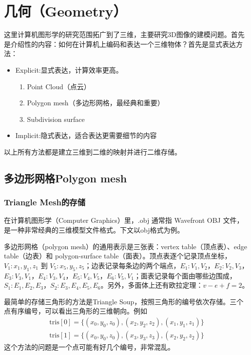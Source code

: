 \section{几何（Geometry）}

这里计算机图形学的研究范围拓广到了三维，主要研究3D图像的建模问题。首先是介绍性的内容：如何在计算机上编码和表达一个三维物体？首先是显式表达方法：

\begin{itemize}
    \item Explicit:显式表达，计算效率更高。
    \begin{enumerate}
        \item Point Cloud（点云）
        \item Polygon mesh（多边形网格，最经典和重要）
        \item Subdivision surface
    \end{enumerate}
    \item Implicit:隐式表达，适合表达更需要细节的内容
\end{itemize}

以上所有方法都是建立三维到二维的映射并进行二维存储。

\subsection{多边形网格Polygon mesh}

\subsubsection{Triangle Mesh的存储}

在计算机图形学（Computer Graphics）里，.obj 通常指 Wavefront OBJ 文件，是一种非常经典的三维模型文件格式。下文以obj格式为例。

多边形网格（polygon mesh）的通用表示是三张表：vertex table（顶点表）、edge table（边表）和 polygon-surface table（面表）。顶点表逐个记录顶点坐标，$V_1: x_1, y_1, z_1$ 到 $V_5: x_5, y_5, z_5$；边表记录每条边的两个端点，$E_1: V_1, V_2$，$E_2: V_2, V_3$，$E_3: V_3, V_1$，$E_4: V_3, V_4$，$E_5: V_4, V_5$，$E_6: V_5, V_1$；面表记录每个面由哪些边围成，$S_1: E_1, E_2, E_3$，$S_2: E_3, E_4, E_5, E_6$。另外，多面体上还有欧拉定理：$v - e + f = 2$。

最简单的存储三角形的方法是Triangle Soup，按照三角形的编号依次存储。三个点有序编号，可以看出三角形的三维朝向。例如
\[
\begin{gathered}
\text{tris}[0] = \{(x_0, y_0, z_0), (x_2, y_2, z_2), (x_1, y_1, z_1)\} \\
\text{tris}[1] = \{(x_0, y_0, z_0), (x_3, y_3, z_3), (x_2, y_2, z_2)\}
\end{gathered}
\]
这个方法的问题是一个点可能有好几个编号，非常混乱。

